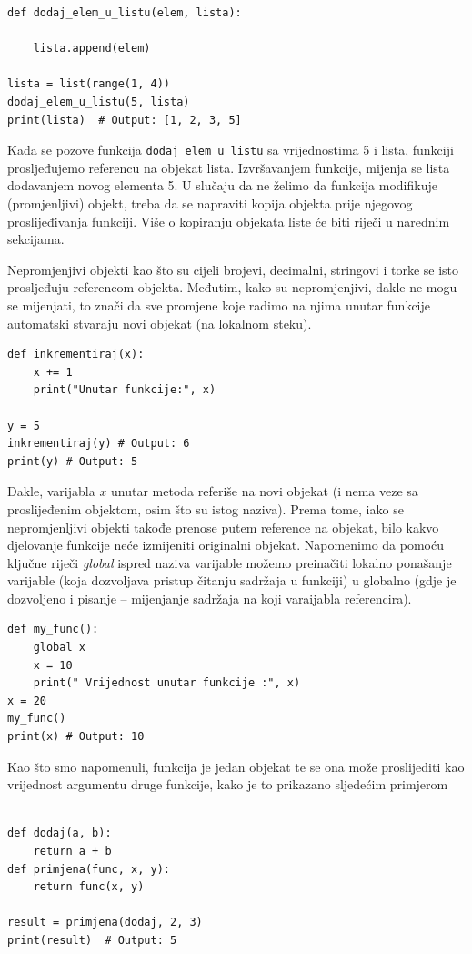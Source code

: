 \begin{verbatim}
def dodaj_elem_u_listu(elem, lista):

    lista.append(elem)

lista = list(range(1, 4))
dodaj_elem_u_listu(5, lista)
print(lista)  # Output: [1, 2, 3, 5]
  \end{verbatim}

Kada se pozove funkcija \texttt{dodaj\_elem\_u\_listu} sa vrijednostima 5 i lista, funkciji prosljeđujemo referencu na objekat lista. Izvršavanjem funkcije, mijenja  se lista dodavanjem novog elementa 5.  U slučaju da ne želimo da funkcija modifikuje (promjenljivi) objekt, treba da se napraviti kopija objekta prije njegovog proslijeđivanja funkciji. Više o kopiranju objekata liste će biti riječi u narednim sekcijama.


Nepromjenjivi objekti kao što su cijeli brojevi, decimalni, stringovi i torke se isto prosljeđuju referencom objekta. Međutim, kako su nepromjenjivi, dakle ne mogu se mijenjati, to znači da sve promjene koje radimo na njima unutar funkcije automatski stvaraju novi objekat (na lokalnom steku).

\begin{verbatim}
def inkrementiraj(x):
    x += 1
    print("Unutar funkcije:", x)

y = 5
inkrementiraj(y) # Output: 6
print(y) # Output: 5
  \end{verbatim}
Dakle, varijabla $x$ unutar metoda referiše na novi objekat (i nema veze sa proslijeđenim objektom, osim što su istog naziva). Prema tome, iako se nepromjenljivi objekti takođe prenose  putem reference na objekat, bilo kakvo djelovanje funkcije  neće izmijeniti originalni objekat.  Napomenimo da pomoću ključne riječi \textit{global} ispred naziva varijable možemo preinačiti lokalno ponašanje varijable (koja dozvoljava pristup čitanju sadržaja u funkciji) u globalno (gdje je dozvoljeno i pisanje -- mijenjanje sadržaja na koji varaijabla referencira).  

\begin{verbatim}
def my_func():
    global x
    x = 10
    print(" Vrijednost unutar funkcije :", x)
x = 20
my_func()
print(x) # Output: 10
\end{verbatim}

Kao što smo napomenuli, funkcija je jedan objekat te se ona može proslijediti kao vrijednost argumentu druge funkcije, kako je to prikazano sljedećim primjerom
\begin{verbatim}

def dodaj(a, b):
    return a + b
def primjena(func, x, y):
    return func(x, y)

result = primjena(dodaj, 2, 3)
print(result)  # Output: 5
  \end{verbatim}


